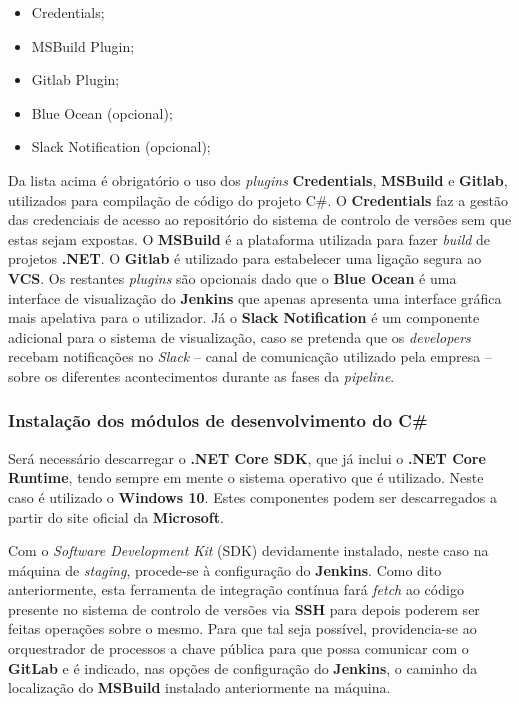 \begin{itemize}
 \item Credentials;
 \item MSBuild Plugin;
 \item Gitlab Plugin;
 \item Blue Ocean (opcional);
 \item Slack Notification (opcional);
\end{itemize}

Da lista acima é obrigatório o uso dos \textit{plugins} \textbf{Credentials}, \textbf{MSBuild} e \textbf{Gitlab}, utilizados para compilação de código do projeto C\#. O \textbf{Credentials} faz a gestão das credenciais de acesso ao repositório do sistema de controlo de versões sem que estas sejam expostas. O \textbf{MSBuild} é a plataforma utilizada para fazer \textit{build} de projetos \textbf{.NET}. O \textbf{Gitlab} é utilizado para estabelecer uma ligação segura ao \textbf{VCS}. Os restantes \textit{plugins} são opcionais dado que o \textbf{Blue Ocean} é uma interface de visualização do \textbf{Jenkins} que apenas apresenta uma interface gráfica mais apelativa para o utilizador. Já o \textbf{Slack Notification} é um componente adicional para o sistema de visualização, caso se pretenda que os \textit{developers} recebam notificações no \textit{Slack} -- canal de comunicação utilizado pela empresa -- sobre os diferentes acontecimentos durante as fases da \textit{pipeline}.

\subsubsection{Instalação dos módulos de desenvolvimento do C\#}

\hspace{1cm}Será necessário descarregar o \textbf{.NET Core SDK}, que já inclui o \textbf{.NET Core Runtime}, tendo sempre em mente o sistema operativo que é utilizado. Neste caso é utilizado o \textbf{Windows 10}. Estes componentes podem ser descarregados a partir do site oficial da \textbf{Microsoft}.

Com o \textit{Software Development Kit} (SDK) devidamente instalado, neste caso na máquina de \textit{staging}, procede-se à configuração do \textbf{Jenkins}. Como dito anteriormente, esta ferramenta de integração contínua fará \textit{fetch} ao código presente no sistema de controlo de versões via \textbf{SSH} para depois poderem ser feitas operações sobre o mesmo. Para que tal seja possível, providencia-se ao orquestrador de processos a chave pública para que possa comunicar com o \textbf{GitLab} e é indicado, nas opções de configuração do \textbf{Jenkins}, o caminho da localização do \textbf{MSBuild} instalado anteriormente na máquina.

